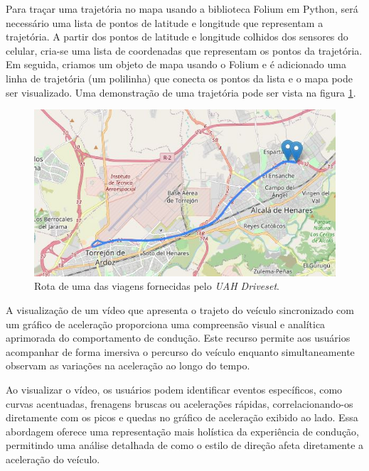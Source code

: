             
    Para traçar uma trajetória no mapa usando a biblioteca Folium em Python, será necessário uma lista de pontos de latitude e longitude que representam a trajetória. A partir dos pontos de latitude e longitude colhidos dos sensores do celular, cria-se uma lista de coordenadas que representam os pontos da trajetória. Em seguida, criamos um objeto de mapa usando o Folium e é adicionado uma linha de trajetória (um polilinha) que conecta os pontos da lista e o mapa pode ser visualizado. Uma demonstração de uma trajetória pode ser vista na figura \ref{fig:car_route_1}.
    
    \begin{figure}[hp]
        \centering
        
        \includegraphics[scale=0.8]{figures/rota_1.jpg}
        
        \caption{Rota de uma das viagens fornecidas pelo \textit{UAH Driveset}.}
        
        \label{fig:car_route_1}
    \end{figure}
    
    A visualização de um vídeo que apresenta o trajeto do veículo sincronizado com um gráfico de aceleração proporciona uma compreensão visual e analítica aprimorada do comportamento de condução. Este recurso permite aos usuários acompanhar de forma imersiva o percurso do veículo enquanto simultaneamente observam as variações na aceleração ao longo do tempo. 
    
    Ao visualizar o vídeo, os usuários podem identificar eventos específicos, como curvas acentuadas, frenagens bruscas ou acelerações rápidas, correlacionando-os diretamente com os picos e quedas no gráfico de aceleração exibido ao lado. Essa abordagem oferece uma representação mais holística da experiência de condução, permitindo uma análise detalhada de como o estilo de direção afeta diretamente a aceleração do veículo. 
    
